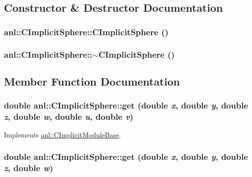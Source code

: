 \subsection{Constructor \& Destructor Documentation}
\hypertarget{classanl_1_1CImplicitSphere_acccac7206a89d32344bd0081689645f6}{
\subsubsection[{CImplicitSphere}]{\setlength{\rightskip}{0pt plus 5cm}anl::CImplicitSphere::CImplicitSphere ()}}
\label{classanl_1_1CImplicitSphere_acccac7206a89d32344bd0081689645f6}
\hypertarget{classanl_1_1CImplicitSphere_a44fdc72d5a96ce284b0ceee69d61fda9}{
\subsubsection[{$\sim$CImplicitSphere}]{\setlength{\rightskip}{0pt plus 5cm}anl::CImplicitSphere::$\sim$CImplicitSphere ()}}
\label{classanl_1_1CImplicitSphere_a44fdc72d5a96ce284b0ceee69d61fda9}


\subsection{Member Function Documentation}
\hypertarget{classanl_1_1CImplicitSphere_a7f6bae7c64d5ff6f0472aa497f216237}{
\subsubsection[{get}]{\setlength{\rightskip}{0pt plus 5cm}double anl::CImplicitSphere::get (double {\em x}, \/  double {\em y}, \/  double {\em z}, \/  double {\em w}, \/  double {\em u}, \/  double {\em v})}}
\label{classanl_1_1CImplicitSphere_a7f6bae7c64d5ff6f0472aa497f216237}


Implements \hyperlink{classanl_1_1CImplicitModuleBase_aa40b7d54572197612a4fea44b63447eb}{anl::CImplicitModuleBase}.\hypertarget{classanl_1_1CImplicitSphere_a08193959ed4c6390025032da175f90ec}{
\subsubsection[{get}]{\setlength{\rightskip}{0pt plus 5cm}double anl::CImplicitSphere::get (double {\em x}, \/  double {\em y}, \/  double {\em z}, \/  double {\em w})}}
\label{classanl_1_1CImplicitSphere_a08193959ed4c6390025032da175f90ec}


